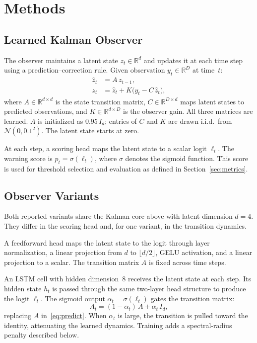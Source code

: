\section{Methods}
\label{sec:methods}

\subsection{Learned Kalman Observer}
\label{sec:methods:observer}

The observer maintains a latent state \(z_t \in \mathbb{R}^d\) and updates it
at each time step using a prediction--correction rule. Given observation
\(y_t \in \mathbb{R}^D\) at time~\(t\):
\begin{align}
  \hat{z}_t &= A\, z_{t-1}, \label{eq:predict} \\
  z_t &= \hat{z}_t + K\bigl(y_t - C\,\hat{z}_t\bigr), \label{eq:correct}
\end{align}
where \(A \in \mathbb{R}^{d \times d}\) is the state transition matrix,
\(C \in \mathbb{R}^{D \times d}\) maps latent states to predicted observations,
and \(K \in \mathbb{R}^{d \times D}\) is the observer gain. All three matrices
are learned. \(A\) is initialized as \(0.95\,I_d\); entries of \(C\) and \(K\)
are drawn i.i.d.\ from \(\mathcal{N}(0, 0.1^2)\). The latent state starts at
zero.

At each step, a scoring head maps the latent state to a scalar logit
\(\ell_t\). The warning score is \(p_t = \sigma(\ell_t)\), where \(\sigma\)
denotes the sigmoid function. This score is used for threshold selection and
evaluation as defined in Section~\ref{sec:metrics}.

\subsection{Observer Variants}
\label{sec:methods:variants}

Both reported variants share the Kalman core above with latent dimension
\(d = 4\). They differ in the scoring head and, for one variant, in the
transition dynamics.

\begin{description}[leftmargin=*]
  \item[Kalman-BCE.]
  A feedforward head maps the latent state to the logit through layer
  normalization, a linear projection from \(d\) to \(\lfloor d/2 \rfloor\),
  GELU activation, and a linear projection to a scalar. The transition matrix
  \(A\) is fixed across time steps.

  \item[Kalman-LSTM-Spec.]
  An LSTM cell \citep{hochreiter1997long} with hidden dimension~8 receives the latent state at each step.
  Its hidden state \(h_t\) is passed through the same two-layer head structure
  to produce the logit \(\ell_t\). The sigmoid output
  \(\alpha_t = \sigma(\ell_t)\) gates the transition matrix:
  \[
    A_t = (1 - \alpha_t)\,A + \alpha_t\,I_d,
  \]
  replacing \(A\) in~\eqref{eq:predict}. When \(\alpha_t\) is large, the
  transition is pulled toward the identity, attenuating the learned dynamics.
  Training adds a spectral-radius penalty described below.
\end{description}

